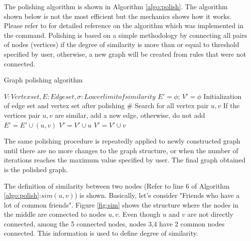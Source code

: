 \begin{figure}[htbp]
\begin{center}
\begin{tabular}{cc}
\end{tabular} 
\end{center}
\end{figure} 

The polishing algorithm is shown in Algorithm \ref{algo:polish}. 
The algorithm shown below  is not the most efficient but the mechanics shows how it works. 
Please refer to \cite{Uno2014} for  detailed reference on the algorithm which was implemented in the command.  
Polishing is based on a simple methodology by  connecting all pairs of nodes (vertices) if the degree of similarity is more than or equal to threshold specified by user, otherwise, a new graph will be created from rules that were not connected. 


\begin{algorithm}
\caption{Graph polishing algorithm \label{algo:polish}}
\begin{small}
\begin{algorithmic}[1]
	\State $V:Vertex set, E:Edge set, \sigma: Lower limit of similarity$
	\State $E'=\phi$; $V'=\phi$ \Comment Initialization of edge set and vertex set after polishing
		 \Comment \# Search for all vertex pair $u,v$
			 \Comment If the vertices pair $u,v$ are similar, add a new edge, otherwise, do not add 
				\State $E'=E'\cup (u,v)$
				\State $V'=V'\cup u$
				\State $V'=V'\cup v$
			\EndIf
		\EndFor
	\EndFor
\EndFunction
\end{algorithmic}
\end{small}
\end{algorithm}

The same polishing procedure is repeatedly applied to newly constructed graph until there are no more changes to the graph structure, or when the number of iterations reaches the maximum value specified by user. The final graph obtained is the polished graph.  

The definition of similarity between two nodes (Refer to line 6 of Algorithm \ref{algo:polish}:$sim(u,v)$) is shown. Basically, let's consider "Friends who have a lot of common friends".   
Figure \ref{fig:sim} shows the structure where the nodes in the middle are  connected to nodes $u,v$.
 Even though $u$ and $v$ are not directly connected, among the 5 connected nodes, nodes 3,4 have 2 common nodes connected.   
 This information is used to define degree of similarity. 
 
